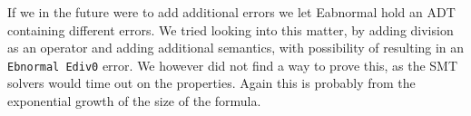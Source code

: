 If we in the future were to add additional errors we let Eabnormal hold an ADT containing different errors.
We tried looking into this matter, by adding division as an operator and adding additional semantics,
with possibility of resulting in an \texttt{Ebnormal Ediv0} error. We however did not find a way to prove this,
as the SMT solvers would time out on the properties.
Again this is probably from the exponential growth of the size of the formula.





